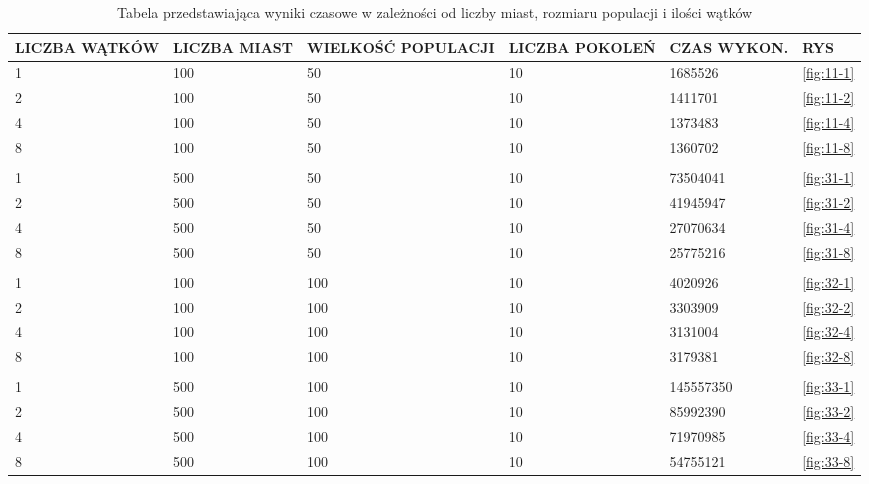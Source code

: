 \documentclass[10pt,a4paper]{article}
\begin{document}
\begin{table}[H]
\begin{tabular}{|p{2cm}|p{2cm}|p{2.2cm}|p{2cm}|p{2.5cm}|p{2cm}|}
\hline
LICZBA  WĄTKÓW & LICZBA  MIAST & WIELKOŚĆ  POPULACJI & LICZBA POKOLEŃ & CZAS WYKON. & RYS\\
\hline
1 & 100 & 50 & 10 &	1685526 & \ref{fig:11-1}\\\hline
2 &	100 & 50 & 10 &	1411701 & \ref{fig:11-2}\\\hline
4 & 100 & 50 & 10 &	1373483 & \ref{fig:11-4}\\\hline
8 &	100 & 50 & 10 &	1360702	& \ref{fig:11-8}\\\hline
\\\hline
1&	500&	50&	10&	73504041&	\ref{fig:31-1}\\\hline
2&	500&	50&	10&	41945947&	\ref{fig:31-2}\\\hline
4&	500&	50&	10&	27070634&	\ref{fig:31-4}\\\hline
8&	500&	50&	10&	25775216&	\ref{fig:31-8}\\\hline
\\\hline			
1&	100&	100&	10&	4020926&	\ref{fig:32-1}\\\hline
2&	100&	100&	10&	3303909&	\ref{fig:32-2}\\\hline
4&	100&	100&	10&	3131004&	\ref{fig:32-4}\\\hline
8&	100&	100&	10&	3179381&	\ref{fig:32-8}\\\hline
\\\hline					
1&	500&	100&	10&	145557350&	\ref{fig:33-1}\\\hline
2&	500&	100&	10&	85992390&	\ref{fig:33-2}\\\hline
4&	500&	100&	10&	71970985&	\ref{fig:33-4}\\\hline
8&	500&	100&	10&	54755121&	\ref{fig:33-8}\\\hline
\hline

\end{tabular}
\caption{Tabela przedstawiająca wyniki czasowe w zależności od liczby miast, rozmiaru populacji i ilości wątków}
\end{table}
\end{document}
